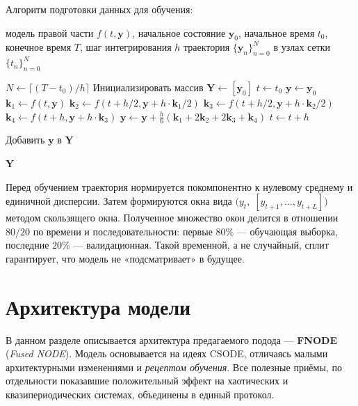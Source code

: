 \documentclass[PMI,VKR]{HSEUniversity}
\begin{document}
Алгоритм подготовки данных для обучения:

\begin{algorithm}[H]
\caption{Сбор траектории методом RK4}
\label{alg:rk4_trajectory}
\begin{algorithmic}[1]
\Require модель правой части $f(t, \mathbf{y})$, начальное состояние $\mathbf{y}_0$, 
начальное время $t_0$, конечное время $T$, шаг интегрирования $h$
\Ensure траектория $\{\mathbf{y}_n\}_{n=0}^{N}$ в узлах сетки $\{t_n\}_{n=0}^{N}$

\State $N \gets \lceil (T - t_0) / h \rceil$
\State Инициализировать массив $\mathbf{Y} \leftarrow [\mathbf{y}_0]$
\State $t \gets t_0$
\State $\mathbf{y} \gets \mathbf{y}_0$
\State
{}
    \State $\mathbf{k}_1 \leftarrow f(t, \mathbf{y})$
    \State $\mathbf{k}_2 \leftarrow f(t + h/2, \mathbf{y} + h \cdot \mathbf{k}_1 / 2)$
    \State $\mathbf{k}_3 \leftarrow f(t + h/2, \mathbf{y} + h \cdot \mathbf{k}_2 / 2)$
    \State $\mathbf{k}_4 \leftarrow f(t + h, \mathbf{y} + h \cdot \mathbf{k}_3)$
    \State $\mathbf{y} \leftarrow \mathbf{y} + \frac{h}{6}(\mathbf{k}_1 + 2\mathbf{k}_2 + 2\mathbf{k}_3 + \mathbf{k}_4)$
    \State $t \gets t + h$
    
    \State Добавить $\mathbf{y}$ в $\mathbf{Y}$
\EndFor

\State \Return $\mathbf{Y}$
\end{algorithmic}
\end{algorithm}




Перед обучением траектория нормируется покомпонентно к нулевому
среднему и единичной дисперсии. Затем формируются окна вида
$\bigl(y_t,\;[y_{t+1},\dots,y_{t+L}]\bigr)$ методом скользящего окна.
Полученное множество окон делится в отношении $80/20$ по времени и
последовательности: первые $80\%$ — обучающая выборка, последние
$20\%$ — валидационная. Такой временной, а не случайный, сплит
гарантирует, что модель не «подсматривает» в будущее.

\section{Архитектура модели}

\label{sec:fnode}

В данном разделе описывается архитектура предагаемого подода --- \textbf{FNODE}
(\emph{Fused NODE}). Модель основывается на идеях CSODE, отличаясь малыми архитектурными изменениями 
и \emph{рецептом обучения}. Все полезные приёмы, по отдельности
показавшие положительный эффект на хаотических и квазипериодических
системах, объединены в единый протокол.
\end{document}
